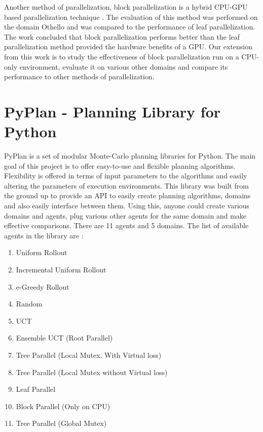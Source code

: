 \documentclass[double,12pt]{beavtex}
\begin{document}
Another method of parallelization, block parallelization is a hybrid CPU-GPU based parallelization technique \cite{rocki2011parallel}. The evaluation of this method was performed on the domain Othello and was compared to the performance of leaf parallelization. The work concluded that block parallelization performs better than the leaf parallelization method provided the hardware benefits of a GPU. Our extension from this work is to study the effectiveness of block parallelization run on a CPU-only environment, evaluate it on various other domains and compare its performance to other methods of parallelization.

\chapter{PyPlan - Planning Library for Python}
PyPlan is a set of modular Monte-Carlo planning libraries for Python. The main goal of this project is to offer easy-to-use and flexible planning algorithms. Flexibility is offered in terms of input parameters to the algorithms and easily altering the parameters of execution environments. This library was built from the ground up to provide an API to easily create planning algorithms, domains and also easily interface between them. Using this, anyone could create various domains and agents, plug various other agents for the same domain and make effective comparisons. There are 11 agents and 5 domains. The list of available agents in the library are :

\begin{enumerate}
\item Uniform Rollout \cite{rolloutlecture} \cite{kocsis2006bandit}
\item Incremental Uniform Rollout \cite{rolloutlecture}
\item e-Greedy Rollout \cite{rolloutlecture}
\item Random \cite{rolloutlecture}
\item UCT 
\item Ensemble UCT (Root Parallel)
\item Tree Parallel (Local Mutex. With Virtual loss)
\item Tree Parallel (Local Mutex without Virtual loss)
\item Leaf Parallel
\item Block Parallel (Only on CPU)
\item Tree Parallel (Global Mutex)
\end{enumerate}
\end{document}
